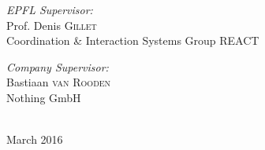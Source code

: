 \begin{titlepage}
\begin{center}
\begin{minipage}{0.5\textwidth}
\begin{flushleft} \large
\emph{EPFL Supervisor:}\\
Prof. Denis \textsc{Gillet}\\
Coordination \& Interaction Systems Group REACT
\end{flushleft}
\end{minipage}
\begin{minipage}{0.4\textwidth}
\begin{flushright} \large
\emph{Company Supervisor:}\\
Bastiaan \textsc{van Rooden}\\
Nothing GmbH\\
~
\end{flushright}
\end{minipage}

\vfill

{\large March 2016}

\end{center}

\end{titlepage}

\pagecolor{white}
\color{black}
